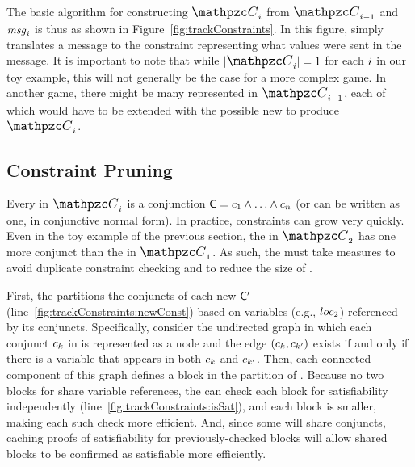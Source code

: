 The basic algorithm for constructing
$\execPathConstraints_{\roundidx}$ from
$\execPathConstraints_{\roundidx-1}$ and $\mathit{msg}_{i}$ is
thus as shown in Figure~\ref{fig:trackConstraints}.  In this figure,
\msgToConstraint simply translates a message to the constraint
representing what values were sent in the message.  It is important to
note that while $|\execPathConstraints_\roundidx|=1$ for each
$i$ in our toy example, this will not generally be the case
for a more complex game.  In another game, there might be many
\execpathcons represented in $\execPathConstraints_{\roundidx-1}$,
each of which would have to be extended with the possible new
\pathsegcons to produce $\execPathConstraints_{\roundidx}$.

\subsection{Constraint Pruning}
\label{ssec:scv:approach:pruning}

Every \execpathcon in $\execPathConstraints_{\roundidx}$ is a
conjunction $\mathsf C = c_1 \wedge \ldots \wedge
c_{n}$ (or can be written as one, in conjunctive
normal form).  In practice, constraints can grow very quickly.  Even
in the toy example of the previous section, the \execpathcon in
$\execPathConstraints_2$ has one more conjunct than the \execpathcon
in $\execPathConstraints_1$.  As such, the \verifier must take
measures to avoid duplicate constraint checking and to reduce the size
of \execpathcons.

First, the \verifier partitions the conjuncts of each new
\execpathcon $\mathsf C'$
(line~\ref{fig:trackConstraints:newConst}) based on variables (e.g.,
$loc_2$) referenced by its conjuncts.  Specifically, consider the
undirected graph in which each conjunct $c_{k}$ in
\newExecPathConstraint is represented as a node and the edge
$(c_{k}, c_{k'})$ exists if and
only if there is a variable that appears in both
$c_{k}$ and $c_{k'}$.  Then,
each connected component of this graph defines a block in the
partition of \newExecPathConstraint.  Because no two blocks for
\newExecPathConstraint share variable references, the \verifier can check
each block for satisfiability independently
(line~\ref{fig:trackConstraints:isSat}), and each block is smaller,
making each such check more efficient.  And, since some \execpathcons
\newExecPathConstraint will share conjuncts, caching proofs
of satisfiability for previously-checked blocks will allow shared
blocks to be confirmed as satisfiable more efficiently.

